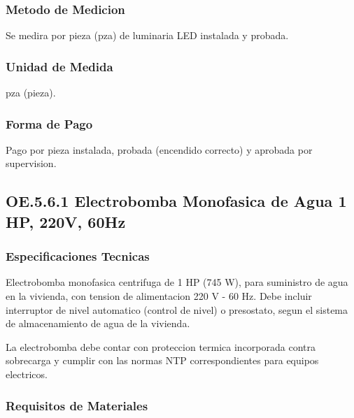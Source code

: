 \subsubsection{Metodo de Medicion}

Se medira por pieza (pza) de luminaria LED instalada y probada.

\subsubsection{Unidad de Medida}

pza (pieza).

\subsubsection{Forma de Pago}

Pago por pieza instalada, probada (encendido correcto) y aprobada por supervision.

\subsection{OE.5.6.1 Electrobomba Monofasica de Agua 1 HP, 220V, 60Hz}

\subsubsection{Especificaciones Tecnicas}

Electrobomba monofasica centrifuga de 1 HP (745 W), para suministro de agua en la vivienda, con tension de alimentacion 220 V - 60 Hz. Debe incluir interruptor de nivel automatico (control de nivel) o presostato, segun el sistema de almacenamiento de agua de la vivienda.

La electrobomba debe contar con proteccion termica incorporada contra sobrecarga y cumplir con las normas NTP correspondientes para equipos electricos.

\subsubsection{Requisitos de Materiales}

